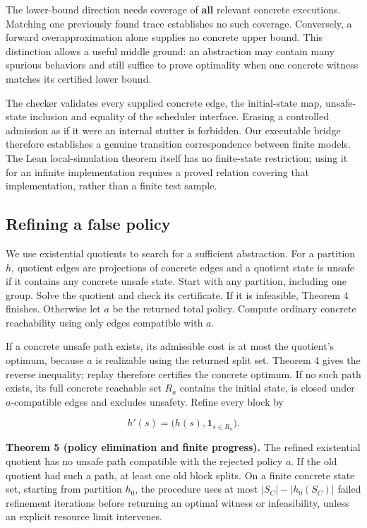 The lower-bound direction needs coverage of \textbf{all} relevant
concrete executions. Matching one previously found trace establishes no
such coverage. Conversely, a forward overapproximation alone supplies no
concrete upper bound. This distinction allows a useful middle ground: an
abstraction may contain many spurious behaviors and still suffice to
prove optimality when one concrete witness matches its certified lower
bound.

The checker validates every supplied concrete edge, the initial-state
map, unsafe-state inclusion and equality of the scheduler interface.
Erasing a controlled admission as if it were an internal stutter is
forbidden. Our executable bridge therefore establishes a genuine
transition correspondence between finite models. The Lean
local-simulation theorem itself has no finite-state restriction; using
it for an infinite implementation requires a proved relation covering
that implementation, rather than a finite test sample.

\subsection{Refining a false policy}\label{refining-a-false-policy}

We use existential quotients to search for a sufficient abstraction. For
a partition \(h\), quotient edges are projections of concrete edges and
a quotient state is unsafe if it contains any concrete unsafe state.
Start with any partition, including one group. Solve the quotient and
check its certificate. If it is infeasible, Theorem 4 finishes.
Otherwise let \(a\) be the returned total policy. Compute ordinary
concrete reachability using only edges compatible with \(a\).

If a concrete unsafe path exists, its admissible cost is at most the
quotient's optimum, because \(a\) is realizable using the returned split
set. Theorem 4 gives the reverse inequality; replay therefore certifies
the concrete optimum. If no such path exists, its full concrete
reachable set \(R_a\) contains the initial state, is closed under
\(a\)-compatible edges and excludes unsafety. Refine every block by

\[
h'(s)=\bigl(h(s),\mathbf 1_{s\in R_a}\bigr).
\]

\textbf{Theorem 5 (policy elimination and finite progress).} The refined
existential quotient has no unsafe path compatible with the rejected
policy \(a\). If the old quotient had such a path, at least one old
block splits. On a finite concrete state set, starting from partition
\(h_0\), the procedure uses at most \(|S_C|-|h_0(S_C)|\) failed
refinement iterations before returning an optimal witness or
infeasibility, unless an explicit resource limit intervenes.

